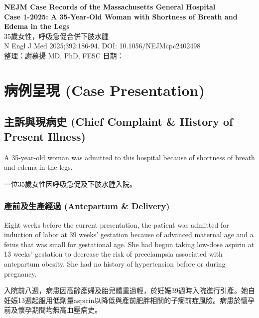 \documentclass[12pt,a4paper]{article}
\begin{document}
\begin{center}
{\LARGE\bfseries\textcolor{emergency_red}{NEJM Case Records of the Massachusetts General Hospital}}\\[0.5cm]
{\Large\textbf{Case 1-2025: A 35-Year-Old Woman with Shortness of Breath and Edema in the Legs}}\\[0.3cm]
{\large 35歲女性，呼吸急促合併下肢水腫}\\[0.5cm]
{\normalsize N Engl J Med 2025;392:186-94. DOI: 10.1056/NEJMcpc2402498}\\[0.3cm]
{\normalsize 整理：謝慕揚 MD, PhD, FESC \quad 日期：\mydate}
\end{center}

\vspace{0.5cm}

\section{病例呈現 (Case Presentation)}

\subsection{主訴與現病史 (Chief Complaint \& History of Present Illness)}

A 35-year-old woman was admitted to this hospital because of shortness of breath and edema in the legs.

一位35歲女性因呼吸急促及下肢水腫入院。

\subsubsection{產前及生產經過 (Antepartum \& Delivery)}

Eight weeks before the current presentation, the patient was admitted for induction of labor at 39 weeks' gestation because of advanced maternal age and a fetus that was small for gestational age. She had begun taking low-dose aspirin at 13 weeks' gestation to decrease the risk of preeclampsia associated with antepartum obesity. She had no history of hypertension before or during pregnancy.

入院前八週，病患因高齡產婦及胎兒體重過輕，於妊娠39週時入院進行引產。她自妊娠13週起服用低劑量aspirin以降低與產前肥胖相關的子癇前症風險。病患於懷孕前及懷孕期間均無高血壓病史。
\end{document}
